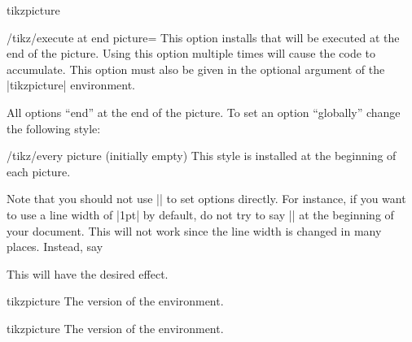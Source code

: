 \begin{environment}{{tikzpicture}}
    \begin{key}{/tikz/execute at end picture=}
        This option installs  that will be executed at the end of
        the picture. Using this option multiple times will cause the code to
        accumulate. This option must also be given in the optional argument of
        the |{tikzpicture}| environment.
\begin{codeexample}[preamble={\usetikzlibrary{backgrounds}}]
\end{codeexample}
    \end{key}

    All options ``end'' at the end of the picture. To set an option
    ``globally'' change the following style:
    \begin{stylekey}{/tikz/every picture (initially \normalfont empty)}
        This style is installed at the beginning of each picture.
\begin{codeexample}
\tikzset{every picture/.style=semithick}
\end{codeexample}
    \end{stylekey}

    Note that you should not use |\tikzset| to set options directly. For
    instance, if you want to use a line width of |1pt| by default, do not try
    to say |\tikzset{line width=1pt}| at the beginning of your document. This
    will not work since the line width is changed in many places. Instead, say
\begin{codeexample}
\end{codeexample}
    This will have the desired effect.
\end{environment}

\begin{plainenvironment}{{tikzpicture}}
    The  version of the environment.
\end{plainenvironment}

\begin{contextenvironment}{{tikzpicture}}
    The  version of the environment.
\end{contextenvironment}


